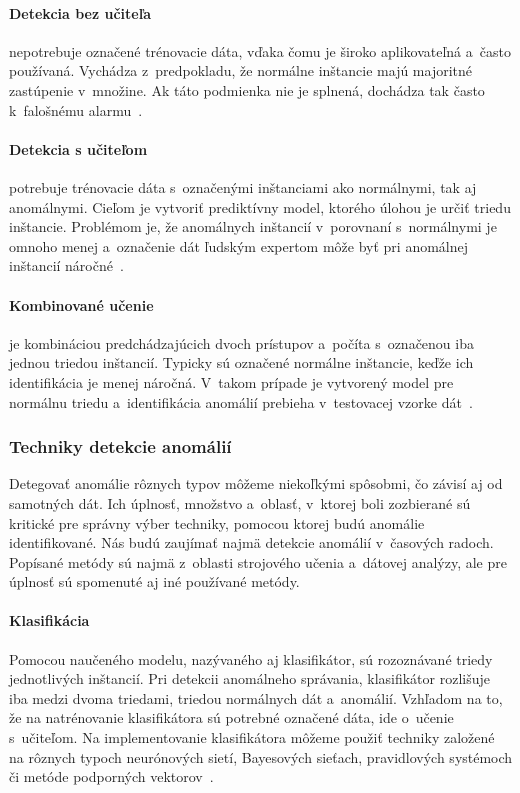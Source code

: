 \documentclass[a4paper,twoside,slovak,12pt,appendix]{article}
\begin{document}
\paragraph{Detekcia bez učiteľa} nepotrebuje označené trénovacie dáta, vďaka
čomu je široko aplikovateľná a~často používaná. Vychádza z~predpokladu, že
normálne inštancie majú majoritné zastúpenie v~množine. Ak táto podmienka nie je
splnená, dochádza tak často k~falošnému alarmu~\cite{Chandola2009}.

\paragraph{Detekcia s učiteľom} potrebuje trénovacie dáta s~označenými
inštanciami ako normálnymi, tak aj anomálnymi. Cieľom je vytvoriť prediktívny
model, ktorého úlohou je určiť triedu inštancie. Problémom je, že anomálnych
inštancií v~porovnaní s~normálnymi je omnoho menej a~označenie dát ľudským
expertom môže byť pri anomálnej inštancií náročné~\cite{Chandola2009}.

\paragraph{Kombinované učenie} je kombináciou predchádzajúcich dvoch prístupov
a~počíta s~označenou iba jednou triedou inštancií. Typicky sú označené normálne
inštancie, keďže ich identifikácia je menej náročná. V~takom prípade je
vytvorený model pre normálnu triedu a~identifikácia anomálií prebieha
v~testovacej vzorke dát~\cite{Chandola2009}.


\subsubsection{Techniky detekcie anomálií}
\label{c-analysis-techniques}
Detegovať anomálie rôznych typov môžeme niekoľkými spôsobmi, čo závisí aj od
samotných dát. Ich úplnosť, množstvo a~oblasť, v~ktorej boli zozbierané sú
kritické pre správny výber techniky, pomocou ktorej budú anomálie
identifikované. Nás budú zaujímať najmä detekcie anomálií v~časových radoch.
Popísané metódy sú najmä z~oblasti strojového učenia a~dátovej analýzy, ale pre
úplnosť sú spomenuté aj iné používané metódy.

\paragraph{Klasifikácia}
Pomocou naučeného modelu, nazývaného aj klasifikátor, sú rozoznávané triedy
jednotlivých inštancií. Pri detekcii anomálneho správania, klasifikátor
rozlišuje iba medzi dvoma triedami, triedou normálnych dát a~anomálií. Vzhľadom
na to, že na natrénovanie klasifikátora sú potrebné označené dáta, ide o~učenie
s~učiteľom. Na implementovanie klasifikátora môžeme použiť techniky založené na
rôznych typoch neurónových sietí, Bayesových sieťach, pravidlových systémoch či
metóde podporných vektorov~\cite{Chandola2009,Tan2005}.
\end{document}
